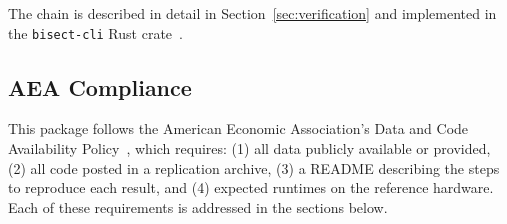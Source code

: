 \noindent The chain is described in detail in Section~\ref{sec:verification}
and implemented in the \texttt{bisect-cli} Rust crate~\cite{dellaLibera2026recursive}.

\subsection*{AEA Compliance}

This package follows the American Economic Association's Data and Code
Availability Policy~\cite{aeaDataPolicy}, which requires:
(1) all data publicly available or provided,
(2) all code posted in a replication archive,
(3) a README describing the steps to reproduce each result,
and (4) expected runtimes on the reference hardware.
Each of these requirements is addressed in the sections below.
